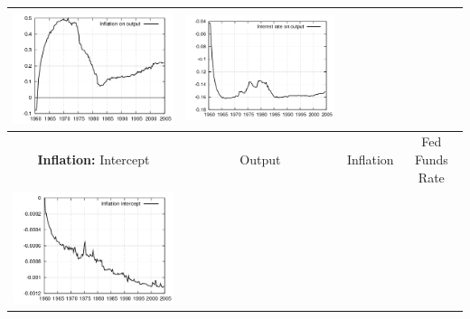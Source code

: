 \documentclass{beamer}
\begin{document}
{\begin{tabular}{|cccc|}
  \includegraphics[scale=0.17]{plots2/initre_Inflation_on_output.png} & 
  \includegraphics[scale=0.17]{plots2/initre_Interest_rate_on_output.png} \\ \hline
  \small{\textbf{Inflation:} Intercept} & \small{Output} & \small{Inflation} & \small{Fed Funds Rate} \\ \hline
  \includegraphics[scale=0.17]{plots2/initre_Inflation_intercept.png} &

\end{tabular}}
\end{document}
